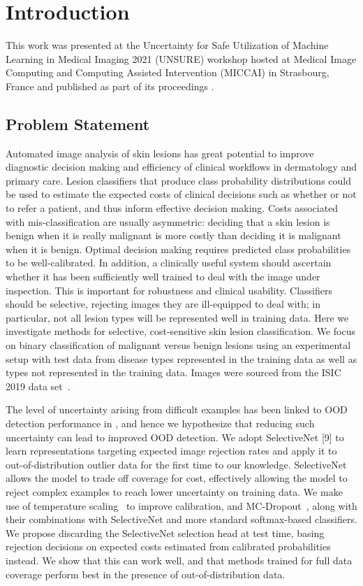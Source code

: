 \section{Introduction}
\label{sec:selective_introduction}
This work was presented at the Uncertainty for Safe Utilization of Machine Learning in Medical Imaging 2021 (UNSURE) workshop hosted at Medical Image Computing and Computing Assisted Intervention (MICCAI) in Strasbourg, France and published as part of its proceedings \citep{carse2021robust}.

\subsection{Problem Statement}
\label{subsec:selective_probelm_statement}
Automated image analysis of skin lesions has great potential to improve diagnostic decision making and efficiency of clinical workflows in dermatology and primary care. Lesion classifiers that produce class probability distributions could be used to estimate the expected costs of clinical decisions such as whether or not to refer a patient, and thus inform effective decision making. Costs associated with mis-classification are usually asymmetric: deciding that a skin lesion is benign when it is really malignant is more costly than deciding it is malignant when it is benign. Optimal decision making requires predicted class probabilities to be well-calibrated. In addition, a clinically useful system should ascertain whether it has been sufficiently well trained to deal with the image under inspection. This is important for robustness and clinical usability. Classifiers should be selective, rejecting images they are ill-equipped to deal with; in particular, not all lesion types will be represented well in training data. Here we investigate methods for selective, cost-sensitive skin lesion classification. We focus on binary classification of malignant versus benign lesions using an experimental setup with test data from disease types represented in the training data as well as types not represented in the training data. Images were sourced from the ISIC 2019 data set~\citep{codella2018skin,Combalia2019,Tschandl2018}.

The level of uncertainty arising from difficult examples has been linked to OOD detection performance in \citep{aleatoric_relation_proof}, and hence we hypothesize that reducing such uncertainty can lead to improved OOD detection. We adopt SelectiveNet [9] to learn representations targeting expected image rejection rates and apply it to out-of-distribution outlier data for the first time to our knowledge. SelectiveNet allows the model to trade off coverage for cost, effectively allowing the model to reject complex examples to reach lower uncertainty on training data. We make use of temperature scaling~\citep{guo2017calibration} to improve calibration, and MC-Dropout~\citep{Gal2016}, along with their combinations with SelectiveNet and more standard softmax-based classifiers. We propose discarding the SelectiveNet selection head at test time, basing rejection decisions on expected costs estimated from calibrated probabilities instead. We show that this can work well, and that methods trained for full data coverage perform best in the presence of out-of-distribution data.

